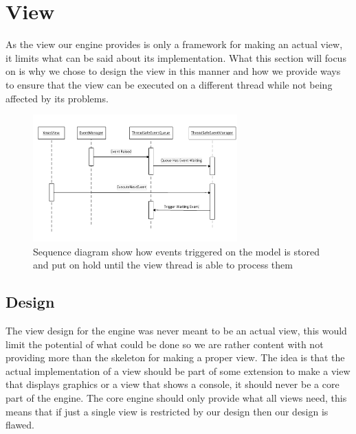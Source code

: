 
\section{View\label{sec:ImplementationView}}

As the view our engine provides is only a framework for making an
actual view, it limits what can be said about its implementation.
What this section will focus on is why we chose to design the view
in this manner and how we provide ways to ensure that the view can
be executed on a different thread while not being affected by its
problems.

\begin{figure}
\begin{centering}
\includegraphics[width=0.7\textwidth]{ViewImpThreadSafeSequenceDiagram}
\par\end{centering}

\caption{Sequence diagram show how events triggered on the model is stored
and put on hold until the view thread is able to process them\label{fig:ThreadSafeSequenceDiagram}}
\end{figure}



\subsection*{Design}

The view design for the engine was never meant to be an actual view,
this would limit the potential of what could be done so we are rather
content with not providing more than the skeleton for making a proper
view. The idea is that the actual implementation of a view should
be part of some extension to make a view that displays graphics or
a view that shows a console, it should never be a core part of the
engine. The core engine should only provide what all views need, this
means that if just a single view is restricted by our design then
our design is flawed.


